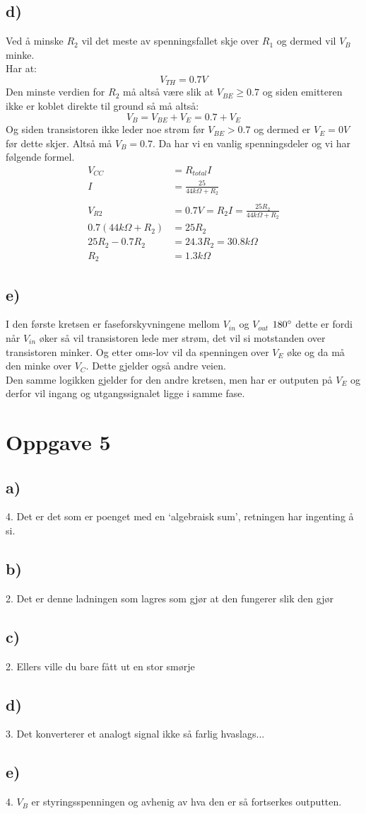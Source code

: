 \documentclass[a4paper, norsk, twoside, 10pt]{article}
\begin{document}
\subsection*{d)}
Ved å minske $R_{2}$ vil det meste av spenningsfallet skje over $R_{1}$ og dermed vil $V_{B}$ minke. \\
Har at: \[V_{TH} = 0.7V \]
Den minste verdien for $R_{2}$ må altså være slik at $V_{BE} \geq 0.7$ og siden emitteren ikke er koblet direkte til ground så må altså:
\[V_{B} = V_{BE} +V_{E} = 0.7 + V_{E}\]
Og siden transistoren ikke leder noe strøm før $V_{BE} > 0.7$ og dermed er $V_E = 0V$ før dette skjer. Altså må $V_B = 0.7$. Da har vi en vanlig spenningsdeler og vi har følgende formel.
\begin{align*}
  V_{CC} &= R_{total}I \\
  I &= \frac{25}{44k\Omega + R_2}\\
  \\
  V_{R2} &= 0.7V = R_2I = \frac{25R_2}{44k\Omega + R_2} \\
  0.7(44k\Omega + R_2) &= 25R_2 \\
  25R_2 -0.7R_2 &= 24.3R_2 = 30.8k\Omega \\
  R_2 &= 1.3k\Omega
\end{align*}


\subsection*{e)}

I den første kretsen er faseforskyvningene mellom $V_{in}$ og $V_{out}$ $180\degree$ dette er fordi når $V_{in}$ øker så vil transistoren lede mer strøm, det vil si motstanden over transistoren minker. Og etter oms-lov vil da spenningen over $V_E$ øke og da må den minke over $V_C$. Dette gjelder også andre veien.
\\
Den samme logikken gjelder for den andre kretsen, men har er outputen på $V_E$ og derfor vil ingang og utgangssignalet ligge i samme fase. 



\section*{Oppgave 5}
\subsection*{a)}
4. Det er det som er poenget med en `algebraisk sum', retningen har ingenting å si.
\subsection*{b)}
2. Det er denne ladningen som lagres som gjør at den fungerer slik den gjør
\subsection*{c)}
2. Ellers ville du bare fått ut en stor smørje
\subsection*{d)}
3. Det konverterer et analogt signal ikke så farlig hvaslags...
\subsection*{e)}
4. $V_{B}$ er styringsspenningen og avhenig av hva den er så fortserkes outputten.
\end{document}
